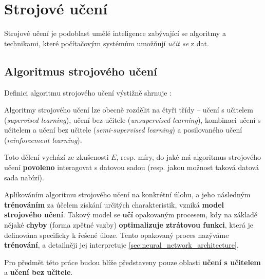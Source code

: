\section{Strojové učení}
Strojové učení je podoblast umělé inteligence zabývající se algoritmy a technikami, které počítačovým systémům umožňují \emph{učit se} z dat.
\begin{definition}
    \label{def:machine_learning}
     \cite{Samuel1967}
\end{definition}
\subsection{Algoritmus strojového učení}
\label{sec:machine_learning_algorithm}
Definici algoritmu strojového učení výstižně shrnuje \textcite[str. 2]{Mitchell1997}:
\begin{definition}
    \label{def:machine_learning_algorithm}
\end{definition}
Algoritmy strojového učení lze obecně rozdělit na čtyři třídy – učení s učitelem (\emph{supervised learning}),
učení bez učitele (\emph{unsupervised learning}), kombinaci učení s učitelem a učení bez učitele (\emph{semi-supervised learning}) a posilovaného učení (\emph{reinforcement learning}).

Toto dělení vychází ze zkušenosti $E$, resp. míry, do jaké má algoritmus strojového učení \textbf{povoleno} interagovat s datovou sadou (resp. jakou možnost taková datová sada nabízí). \cite{Goodfellow2016}

Aplikováním algoritmu strojového učení na konkrétní úlohu, a jeho následným \textbf{trénováním} za účelem získání určitých charakteristik, vzniká \textbf{model strojového učení}.
Takový model se \textbf{učí} opakovaným procesem, kdy na základě nějaké \textbf{chyby} (forma zpětné vazby) \textbf{optimalizuje ztrátovou funkci}, která je definována specificky k řešené úloze.
Tento opakovaný proces nazýváme \textbf{trénování}, a detailněji jej interpretuje \autoref{sec:neural_network_architecture}.

Pro předmět této práce budou blíže představeny pouze oblasti \textbf{učení s učitelem} a \textbf{učení bez učitele}.
